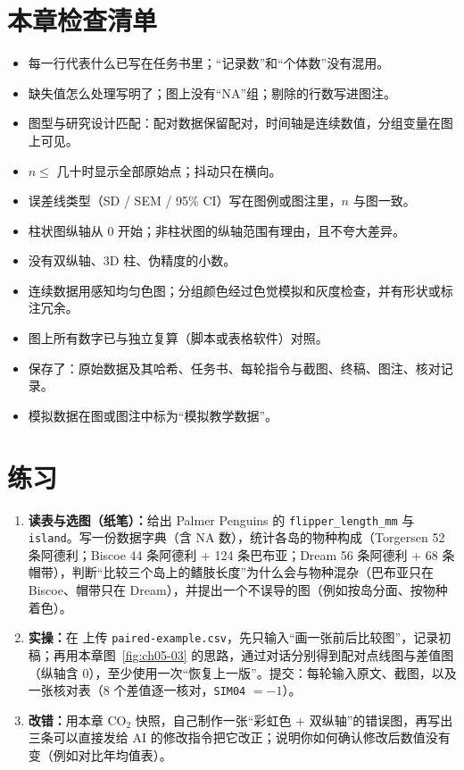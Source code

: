 \section{本章检查清单}

\begin{itemize}
\item 每一行代表什么已写在任务书里；“记录数”和“个体数”没有混用。
\item 缺失值怎么处理写明了；图上没有“NA”组；剔除的行数写进图注。
\item 图型与研究设计匹配：配对数据保留配对，时间轴是连续数值，分组变量在图上可见。
\item $n \le$ 几十时显示全部原始点；抖动只在横向。
\item 误差线类型（SD / SEM / 95\% CI）写在图例或图注里，$n$ 与图一致。
\item 柱状图纵轴从 0 开始；非柱状图的纵轴范围有理由，且不夸大差异。
\item 没有双纵轴、3D 柱、伪精度的小数。
\item 连续数据用感知均匀色图；分组颜色经过色觉模拟和灰度检查，并有形状或标注冗余。
\item 图上所有数字已与独立复算（脚本或表格软件）对照。
\item 保存了：原始数据及其哈希、任务书、每轮指令与截图、终稿、图注、核对记录。
\item 模拟数据在图或图注中标为“模拟教学数据”。
\end{itemize}

\section{练习}

\begin{enumerate}
\item \textbf{读表与选图（纸笔）：}给出 Palmer Penguins 的 \texttt{flipper\_length\_mm} 与 \texttt{island}。写一份数据字典（含 NA 数），统计各岛的物种构成（Torgersen 52 条阿德利；Biscoe 44 条阿德利 + 124 条巴布亚；Dream 56 条阿德利 + 68 条帽带），判断“比较三个岛上的鳍肢长度”为什么会与物种混杂（巴布亚只在 Biscoe、帽带只在 Dream），并提出一个不误导的图（例如按岛分面、按物种着色）。
\item \textbf{\scidraw{} 实操：}在  上传 \texttt{paired-example.csv}，先只输入“画一张前后比较图”，记录初稿；再用本章图~\ref{fig:ch05-03} 的思路，通过对话分别得到配对点线图与差值图（纵轴含 0），至少使用一次“恢复上一版”。提交：每轮输入原文、截图，以及一张核对表（8 个差值逐一核对，\texttt{SIM04} $= -1$）。
\item \textbf{改错：}用本章 $\text{CO}_2$ 快照，自己制作一张“彩虹色 + 双纵轴”的错误图，再写出三条可以直接发给 AI 的修改指令把它改正；说明你如何确认修改后数值没有变（例如对比年均值表）。
\end{enumerate}

